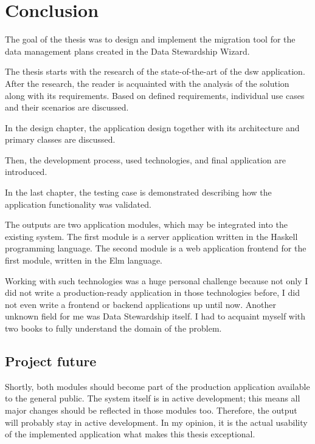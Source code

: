 \chapter{Conclusion}
\vspace{-0.1cm}
The goal of the thesis was to design and implement the migration tool for the data management plans created in the Data Stewardship Wizard.

The thesis starts with the research of the state-of-the-art of the \gls{dsw} application.
After the research, the reader is acquainted with the analysis of the solution along with its requirements.
Based on defined requirements, individual use cases and their scenarios are discussed.

In the design chapter, the application design together with its architecture and primary classes are discussed.

Then, the development process, used technologies, and final application are introduced.

In the last chapter, the testing case is demonstrated describing how the application functionality was validated.

The outputs are two application modules, which may be integrated into the existing system.
The first module is a server application written in the Haskell programming language.
The second module is a web application frontend for the first module, written in the Elm language.

Working with such technologies was a huge personal challenge because not only I did not write a production-ready application in those technologies before, I did not even write a frontend or backend applications up until now.
Another unknown field for me was Data Stewardship itself.
I had to acquaint myself with two books \cite{b1-os, b2-ds} to fully understand the domain of the problem.

\vspace{-0.3cm}
\section*{Project future}
\vspace{-0.1cm}
Shortly, both modules should become part of the production application available to the general public.
The system itself is in active development; this means all major changes should be reflected in those modules too.
Therefore, the output will probably stay in active development.
In my opinion, it is the actual usability of the implemented application what makes this thesis exceptional.
